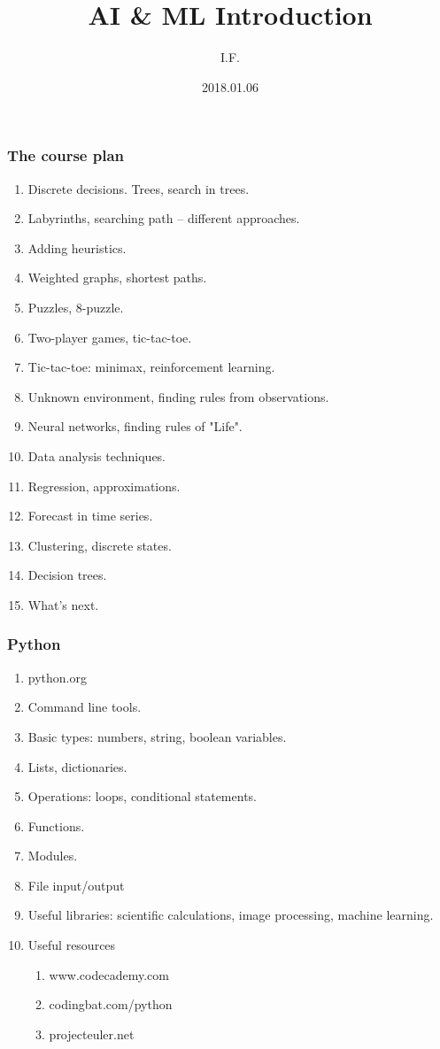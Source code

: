 \documentclass{beamer}
\title{AI \& ML Introduction}
\author{I.F.}
\institute{mlschool2017.wordpress.com, repl.it}
\date{2018.01.06}
\begin{document}
 
\frame{\titlepage}
 

\begin{frame}
\frametitle{The course plan}

\begin{enumerate}
\item Discrete decisions. Trees, search in trees.
\item Labyrinths, searching path -- different approaches.
\item Adding heuristics.
\item Weighted graphs, shortest paths.
\item Puzzles, 8-puzzle.
\item Two-player games, tic-tac-toe.
\item Tic-tac-toe: minimax, reinforcement learning.
\item Unknown environment, finding rules from observations.
\item Neural networks, finding rules of "Life".
\item Data analysis techniques.
\item Regression, approximations.
\item Forecast in time series.
\item Clustering, discrete states.
\item Decision trees.
\item What's next.
\end{enumerate}

\end{frame}


\begin{frame}
\frametitle{Python}

\begin{enumerate}
\item python.org
\item Command line tools.
\item Basic types: numbers, string, boolean variables.
\item Lists, dictionaries.
\item Operations: loops, conditional statements.
\item Functions.
\item Modules.
\item File input/output
\item Useful libraries: scientific calculations, image processing, machine learning.
\item Useful resources
    \begin{enumerate}
        \item www.codecademy.com
        \item codingbat.com/python
        \item projecteuler.net
    \end{enumerate}
\end{enumerate}

\end{frame}
\end{document}
